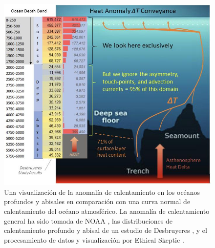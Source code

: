 \documentclass[10pt,twocolumn,letterpaper]{article}
\begin{document}
\begin{figure}[t]
\begin{center}
\includegraphics[width=1\textwidth]{deepsea.jpg}
\end{center}
   \caption{Una visualización de la anomalía de calentamiento en los océanos profundos y abisales en comparación con una curva normal de calentamiento del océano atmosférico. La anomalía de calentamiento general ha sido tomada de NOAA \cite{147}, las distribuciones de calentamiento profundo y abisal de un estudio de Desbruyeres \cite{132}, y el procesamiento de datos y visualización por Ethical Skeptic \cite{129}.}
\label{fig:21}
\end{figure}
\end{document}
